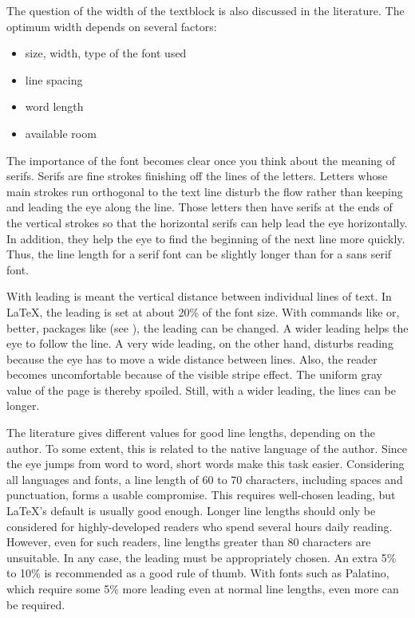 \begin{Explain}
  The question of the width of the textblock is also discussed in
  the literature. The optimum width depends on several factors:
  \begin{itemize}
  \item size, width, type of the font used
  \item line spacing
  \item word length
  \item available room
  \end{itemize}
  The importance of the font becomes clear once you think about the
  meaning of serifs. Serifs are fine strokes
  finishing off the lines of the letters. Letters whose main strokes
  run orthogonal to the text line disturb the flow rather than keeping
  and leading the eye along the line. Those letters then have serifs
  at the ends of the vertical strokes so that the horizontal serifs
  can help lead the eye horizontally. In addition, they help the eye
  to find the beginning of the next line more quickly. Thus, the line
  length for a serif font can be slightly longer than for a sans serif
  font.

  With leading is meant the vertical
  distance between individual lines of text. In {\LaTeX}, the leading
  is set at about 20\% of the font size. With commands like
   or, better, packages like
   (see
  \cite{package:setspace}), the leading can be changed. A wider
  leading helps the eye to follow the line. A very wide leading, on
  the other hand, disturbs reading because the eye has to move a wide
  distance between lines. Also, the reader becomes uncomfortable
  because of the visible stripe effect. The uniform gray value of the
  page is thereby spoiled. Still, with a wider leading, the lines can
  be longer.

  The literature gives different values for good line
  lengths, depending on the author. To
  some extent, this is related to the native language of the
  author. Since the eye jumps from word to word, short words make this
  task easier. Considering all languages and fonts, a line length of
  60 to 70 characters, including spaces and punctuation, forms a
  usable compromise. This requires well-chosen leading, but {\LaTeX}'s
  default is usually good enough. Longer line lengths should only be
  considered for highly-developed readers who spend several hours
  daily reading. However, even for such readers, line lengths greater than 80
  characters are unsuitable. In any case, the leading must be
  appropriately chosen. An extra 5\% to 10\% is recommended as a good
  rule of thumb. With fonts such as Palatino, which require some 5\%
  more leading even at normal line lengths, even more can be
  required.


\end{Explain}
